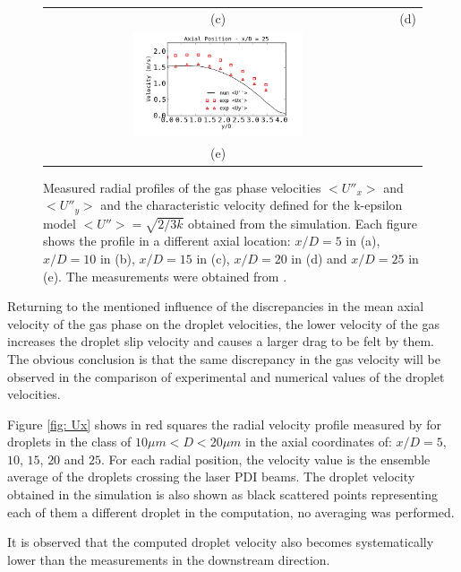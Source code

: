 \begin{figure}[!htb]
\begin{tabular}{cc}
(c) & (d) \\
\includegraphics[width=0.5\textwidth]{./figuras/chap5/UU/UUx25.png} &  \\
(e) & \\
\end{tabular}
 \caption{Measured radial profiles of the gas phase velocities $<U''_x>$ and $<U''_y>$ and the characteristic velocity defined for the k-epsilon model $<U''>=\sqrt{2/3 k}$ obtained from the simulation. Each figure shows the profile in a different axial location: $x/D=5$ in (a), $x/D=10$ in (b), $x/D=15$ in (c), $x/D=20$ in (d) and $x/D=25$ in (e). The measurements were obtained from \cite{chen}.}
\label{fig: UUx}
\end{figure}

Returning to the mentioned influence of the discrepancies in the mean axial velocity of the gas phase on the droplet velocities, the lower velocity of the gas increases the droplet slip velocity and causes a larger drag to be felt by them. The obvious conclusion is that the same discrepancy in the gas velocity will be observed in the comparison of experimental and numerical values of the droplet velocities.

Figure \ref{fig: Ux} shows in red squares the radial velocity profile measured  by \cite{chen} for droplets in the class of $10\mu m <D<20\mu m$ in the axial coordinates of: $x/D=5$, $10$, $15$, $20$ and $25$.  For each radial position, the velocity value is the ensemble average of the droplets crossing the laser PDI beams. The droplet velocity obtained in the simulation is also shown as black scattered points representing each of them a different droplet in the computation, no averaging was performed.

It is observed that the computed droplet velocity also becomes systematically lower than the measurements in the downstream direction.


